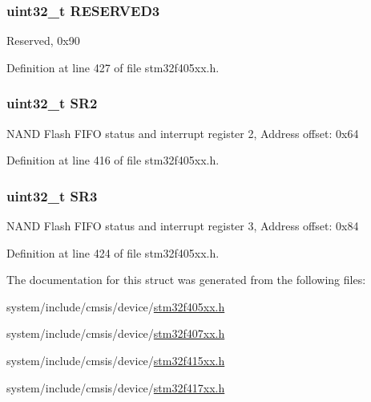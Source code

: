 \subsubsection[{\texorpdfstring{R\+E\+S\+E\+R\+V\+E\+D3}{RESERVED3}}]{\setlength{\rightskip}{0pt plus 5cm}uint32\+\_\+t R\+E\+S\+E\+R\+V\+E\+D3}\hypertarget{struct_f_s_m_c___bank2__3___type_def_af2b40c5e36a5e861490988275499e158}{}\label{struct_f_s_m_c___bank2__3___type_def_af2b40c5e36a5e861490988275499e158}
Reserved, 0x90 

Definition at line 427 of file stm32f405xx.\+h.

\subsubsection[{\texorpdfstring{S\+R2}{SR2}}]{ uint32\+\_\+t S\+R2}\hypertarget{struct_f_s_m_c___bank2__3___type_def_a89623ee198737b29dc0a803310605a83}{}\label{struct_f_s_m_c___bank2__3___type_def_a89623ee198737b29dc0a803310605a83}
N\+A\+ND Flash F\+I\+FO status and interrupt register 2, Address offset\+: 0x64 

Definition at line 416 of file stm32f405xx.\+h.

\subsubsection[{\texorpdfstring{S\+R3}{SR3}}]{ uint32\+\_\+t S\+R3}\hypertarget{struct_f_s_m_c___bank2__3___type_def_af30c34f7c606cb9416a413ec5fa36491}{}\label{struct_f_s_m_c___bank2__3___type_def_af30c34f7c606cb9416a413ec5fa36491}
N\+A\+ND Flash F\+I\+FO status and interrupt register 3, Address offset\+: 0x84 

Definition at line 424 of file stm32f405xx.\+h.



The documentation for this struct was generated from the following files\+:\begin{DoxyCompactItemize}
\item 
system/include/cmsis/device/\hyperlink{stm32f405xx_8h}{stm32f405xx.\+h}\item 
system/include/cmsis/device/\hyperlink{stm32f407xx_8h}{stm32f407xx.\+h}\item 
system/include/cmsis/device/\hyperlink{stm32f415xx_8h}{stm32f415xx.\+h}\item 
system/include/cmsis/device/\hyperlink{stm32f417xx_8h}{stm32f417xx.\+h}\end{DoxyCompactItemize}
